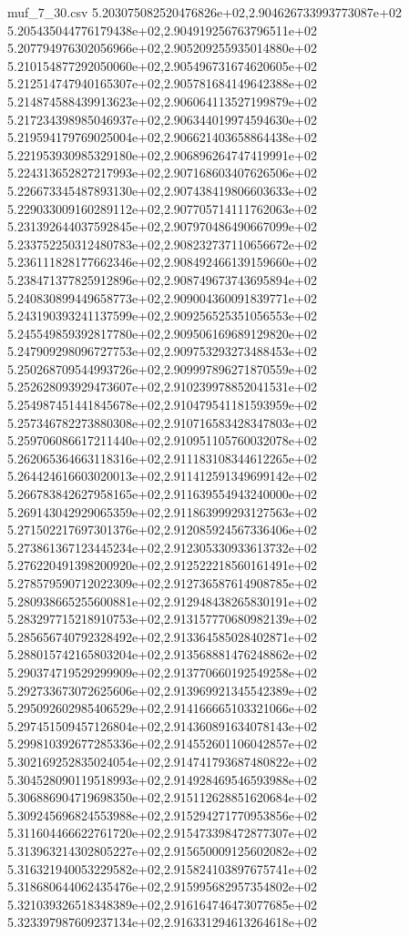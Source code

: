 \begin{filecontents*}{muf_7_30.csv}
5.203075082520476826e+02,2.904626733993773087e+02
5.205435044776179438e+02,2.904919256763796511e+02
5.207794976302056966e+02,2.905209255935014880e+02
5.210154877292050060e+02,2.905496731674620605e+02
5.212514747940165307e+02,2.905781684149642388e+02
5.214874588439913623e+02,2.906064113527199879e+02
5.217234398985046937e+02,2.906344019974594630e+02
5.219594179769025004e+02,2.906621403658864438e+02
5.221953930985329180e+02,2.906896264747419991e+02
5.224313652827217993e+02,2.907168603407626506e+02
5.226673345487893130e+02,2.907438419806603633e+02
5.229033009160289112e+02,2.907705714111762063e+02
5.231392644037592845e+02,2.907970486490667099e+02
5.233752250312480783e+02,2.908232737110656672e+02
5.236111828177662346e+02,2.908492466139159660e+02
5.238471377825912896e+02,2.908749673743695894e+02
5.240830899449658773e+02,2.909004360091839771e+02
5.243190393241137599e+02,2.909256525351056553e+02
5.245549859392817780e+02,2.909506169689129820e+02
5.247909298096727753e+02,2.909753293273488453e+02
5.250268709544993726e+02,2.909997896271870559e+02
5.252628093929473607e+02,2.910239978852041531e+02
5.254987451441845678e+02,2.910479541181593959e+02
5.257346782273880308e+02,2.910716583428347803e+02
5.259706086617211440e+02,2.910951105760032078e+02
5.262065364663118316e+02,2.911183108344612265e+02
5.264424616603020013e+02,2.911412591349699142e+02
5.266783842627958165e+02,2.911639554943240000e+02
5.269143042929065359e+02,2.911863999293127563e+02
5.271502217697301376e+02,2.912085924567336406e+02
5.273861367123445234e+02,2.912305330933613732e+02
5.276220491398200920e+02,2.912522218560161491e+02
5.278579590712022309e+02,2.912736587614908785e+02
5.280938665255600881e+02,2.912948438265830191e+02
5.283297715218910753e+02,2.913157770680982139e+02
5.285656740792328492e+02,2.913364585028402871e+02
5.288015742165803204e+02,2.913568881476248862e+02
5.290374719529299909e+02,2.913770660192549258e+02
5.292733673072625606e+02,2.913969921345542389e+02
5.295092602985406529e+02,2.914166665103321066e+02
5.297451509457126804e+02,2.914360891634078143e+02
5.299810392677285336e+02,2.914552601106042857e+02
5.302169252835024054e+02,2.914741793687480822e+02
5.304528090119518993e+02,2.914928469546593988e+02
5.306886904719698350e+02,2.915112628851620684e+02
5.309245696824553988e+02,2.915294271770953856e+02
5.311604466622761720e+02,2.915473398472877307e+02
5.313963214302805227e+02,2.915650009125602082e+02
5.316321940053229582e+02,2.915824103897675741e+02
5.318680644062435476e+02,2.915995682957354802e+02
5.321039326518348389e+02,2.916164746473077685e+02
5.323397987609237134e+02,2.916331294613264618e+02

\end{filecontents*}
